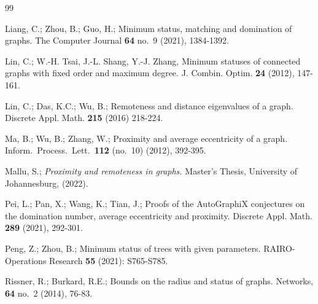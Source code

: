 \documentclass[a4paper,11pt]{article}
\begin{document}
\begin{thebibliography}{99}
       
 Liang, C.; Zhou, B.; Guo, H.;  
     Minimum status, matching and domination of graphs. 
     The Computer Journal {\bf 64} no.\ 9 (2021), 1384-1392.
     
 Lin, C.; W.-H. Tsai, J.-L. Shang, Y.-J. Zhang,
     Minimum statuses of connected graphs with fixed order and maximum degree.
     J. Combin. Optim. {\bf 24} (2012), 147-161.      
 
  Lin, C.; Das, K.C.; Wu, B.; 
     Remoteness and distance eigenvalues of a graph. 
     Discrete Appl. Math. {\bf 215} (2016) 218-224.

 
 Ma, B.; Wu, B.; Zhang, W.;
     Proximity and average eccentricity of a graph.
     Inform.\ Process.\ Lett.\ {\bf 112} (no.\ 10) (2012), 392-395. 

     
 Mallu, S.; 
      \textit{Proximity and remoteness in graphs.}  
      Master’s Thesis, University of  Johannesburg, (2022).
     
      

     
            
 Pei, L.; Pan, X.; Wang, K.; Tian, J.; 
     Proofs of the AutoGraphiX conjectures on the domination number, average eccentricity and proximity. 
     Discrete Appl. Math. {\bf 289} (2021), 292-301.   
         
 Peng, Z.; Zhou, B.; 
     Minimum status of trees with given parameters. 
     RAIRO-Operations Research {\bf 55} (2021): S765-S785.  

 Rissner, R.; Burkard, R.E.;  
     Bounds on the radius and status of graphs. 
     Networks, {\bf 64} no.\ 2 (2014), 76-83.     


\end{thebibliography}
\end{document}
